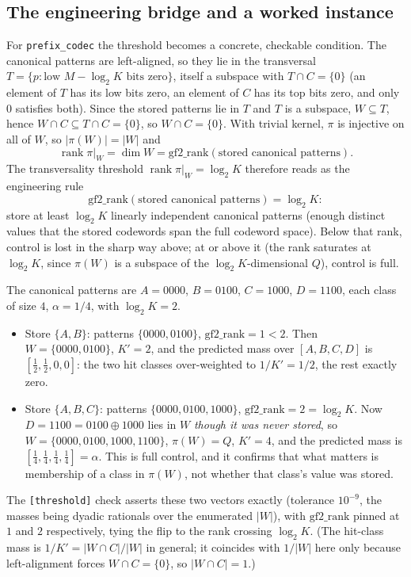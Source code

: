 \documentclass[acmsmall,review]{acmart}
\DeclareMathOperator{\rank}{rank}
\newcommand{\W}{W}                          %
\newcommand{\proj}{\pi}                     %
\newcommand{\Quot}{Q}                       %
\newcommand{\al}{\alpha}                    %
\newcommand{\inter}{\cap}
\begin{document}
\subsection{The engineering bridge and a worked instance}

For \texttt{prefix\_codec} the threshold becomes a concrete, checkable condition. The
canonical patterns are left-aligned, so they lie in the transversal
$T = \{p : \text{low } M - \log_2 K \text{ bits zero}\}$, itself a subspace with
$T \inter C = \{0\}$ (an element of $T$ has its low bits zero, an element of $C$ has its
top bits zero, and only $0$ satisfies both). Since the stored patterns lie in $T$ and
$T$ is a subspace, $\W \subseteq T$, hence $\W \inter C \subseteq T \inter C = \{0\}$,
so $\W \inter C = \{0\}$. With trivial kernel, $\proj$ is injective on all of $\W$, so
$|\proj(\W)| = |\W|$ and
\begin{equation}
  \rank \proj|_{\W} = \dim \W = \mathrm{gf2\_rank}(\text{stored canonical patterns}).
  \label{eq:bridge}
\end{equation}
The transversality threshold $\rank \proj|_{\W} = \log_2 K$ therefore reads as the
engineering rule
\[
  \mathrm{gf2\_rank}(\text{stored canonical patterns}) = \log_2 K:
\]
store at least $\log_2 K$ linearly independent canonical patterns (enough distinct
values that the stored codewords span the full codeword space). Below that rank,
control is lost in the sharp way above; at or above it (the rank saturates at $\log_2 K$,
since $\proj(\W)$ is a subspace of the $\log_2 K$-dimensional $\Quot$), control is full.

\begin{example}[The length-2 codec on $M = 4$, $K = 4$]
\label{ex:m4}
The canonical patterns are $A = 0000$, $B = 0100$, $C = 1000$, $D = 1100$, each class of
size $4$, $\al = 1/4$, with $\log_2 K = 2$.
\begin{itemize}
  \item Store $\{A, B\}$: patterns $\{0000, 0100\}$, $\mathrm{gf2\_rank} = 1 < 2$. Then
  $\W = \{0000, 0100\}$, $K' = 2$, and the predicted mass over $[A,B,C,D]$ is
  $[\tfrac12, \tfrac12, 0, 0]$: the two hit classes over-weighted to $1/K' = 1/2$, the
  rest exactly zero.
  \item Store $\{A, B, C\}$: patterns $\{0000, 0100, 1000\}$, $\mathrm{gf2\_rank} = 2 =
  \log_2 K$. Now $D = 1100 = 0100 \oplus 1000$ lies in $\W$ \emph{though it was never
  stored}, so $\W = \{0000, 0100, 1000, 1100\}$, $\proj(\W) = \Quot$, $K' = 4$, and the
  predicted mass is $[\tfrac14, \tfrac14, \tfrac14, \tfrac14] = \al$. This is full
  control, and it confirms that what matters is membership of a class in $\proj(\W)$, not
  whether that class's value was stored.
\end{itemize}
The \texttt{[threshold]} check asserts these two vectors exactly (tolerance $10^{-9}$,
the masses being dyadic rationals over the enumerated $|\W|$), with $\mathrm{gf2\_rank}$
pinned at $1$ and $2$ respectively, tying the flip to the rank crossing $\log_2 K$. (The
hit-class mass is $1/K' = |\W \inter C|/|\W|$ in general; it coincides with $1/|\W|$ here
only because left-alignment forces $\W \inter C = \{0\}$, so $|\W \inter C| = 1$.)
\end{example}
\end{document}
